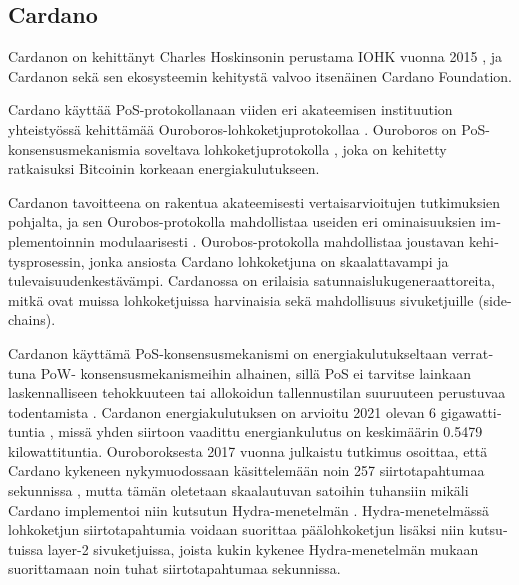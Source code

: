 \subsection{Cardano\label{cardano}}
\begin{otherlanguage}{english}

Cardanon on kehittänyt Charles Hoskinsonin perustama IOHK vuonna 2015 \cite{cardanowhitepaper, iohk}, ja Cardanon sekä sen ekosysteemin kehitystä valvoo itsenäinen Cardano Foundation. 

Cardano käyttää PoS-protokollanaan viiden eri akateemisen instituution yhteistyössä kehittämää Ouroboros-lohkoketjuprotokollaa \cite{cardanowhitepaper}. Ouroboros on PoS-konsensusmekanismia soveltava lohkoketjuprotokolla \cite{cardano-ouroboros}, joka on kehitetty ratkaisuksi Bitcoinin korkeaan energiakulutukseen.

Cardanon tavoitteena on rakentua akateemisesti vertaisarvioitujen tutkimuksien pohjalta, ja sen Ourobos-protokolla mahdollistaa useiden eri ominaisuuksien implementoinnin modulaarisesti \cite{cardanowhitepaper}. Ourobos-protokolla mahdollistaa joustavan kehitysprosessin, jonka ansiosta Cardano lohkoketjuna on skaalattavampi ja tulevaisuudenkestävämpi. Cardanossa on erilaisia satunnaislukugeneraattoreita, mitkä ovat muissa lohkoketjuissa harvinaisia sekä mahdollisuus sivuketjuille (side-chains).

Cardanon käyttämä PoS-konsensusmekanismi on energiakulutukseltaan verrattuna PoW- konsensusmekanismeihin alhainen, sillä PoS ei tarvitse lainkaan laskennalliseen tehokkuuteen tai allokoidun tallennustilan suuruuteen perustuvaa todentamista \cite{cardanowhitepaper}. Cardanon energiakulutuksen on arvioitu 2021 olevan 6 gigawattituntia \cite{cardanoenergy}, missä yhden siirtoon vaadittu energiankulutus on keskimäärin 0.5479 kilowattituntia. Ouroboroksesta 2017 vuonna julkaistu tutkimus osoittaa, että Cardano kykeneen nykymuodossaan käsittelemään noin 257 siirtotapahtumaa sekunnissa \cite{cardano-tps}, mutta tämän oletetaan skaalautuvan satoihin tuhansiin mikäli Cardano implementoi niin kutsutun Hydra-menetelmän \cite{cardano-hydra}. Hydra-menetelmässä lohkoketjun siirtotapahtumia voidaan suorittaa päälohkoketjun lisäksi niin kutsutuissa layer-2 sivuketjuissa, joista kukin kykenee Hydra-menetelmän mukaan suorittamaan noin tuhat siirtotapahtumaa sekunnissa.

\end{otherlanguage}
